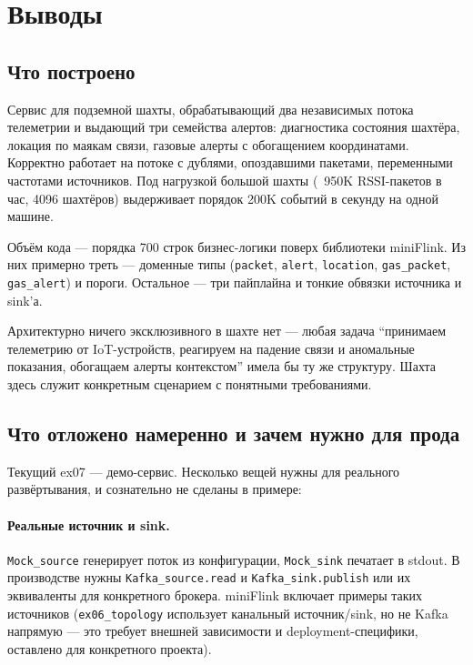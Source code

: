 
\section{Выводы}\label{sec:conclusions}

\subsection{Что построено}

Сервис для подземной шахты, обрабатывающий два независимых потока
телеметрии и выдающий три семейства алертов: диагностика состояния
шахтёра, локация по маякам связи, газовые алерты с обогащением
координатами. Корректно работает на потоке с дублями, опоздавшими
пакетами, переменными частотами источников. Под нагрузкой большой
шахты (~950K RSSI-пакетов в час, 4096 шахтёров) выдерживает порядок
200K событий в секунду на одной машине.

Объём кода --- порядка 700 строк бизнес-логики поверх библиотеки
miniFlink. Из них примерно треть --- доменные типы (\texttt{packet},
\texttt{alert}, \texttt{location}, \texttt{gas\_packet},
\texttt{gas\_alert}) и пороги. Остальное --- три пайплайна и
тонкие обвязки источника и sink'а.

Архитектурно ничего эксклюзивного в шахте нет --- любая задача
``принимаем телеметрию от IoT-устройств, реагируем на падение
связи и аномальные показания, обогащаем алерты контекстом'' имела
бы ту же структуру. Шахта здесь служит конкретным сценарием с
понятными требованиями.

\subsection{Что отложено намеренно и зачем нужно для прода}

Текущий ex07 --- демо-сервис. Несколько вещей нужны для реального
развёртывания, и сознательно не сделаны в примере:

\paragraph{Реальные источник и sink.} \texttt{Mock\_source}
генерирует поток из конфигурации, \texttt{Mock\_sink} печатает в
stdout. В производстве нужны \texttt{Kafka\_source.read} и
\texttt{Kafka\_sink.publish} или их эквиваленты для конкретного
брокера. miniFlink включает примеры таких источников
(\texttt{ex06\_topology} использует канальный источник/sink, но
не Kafka напрямую --- это требует внешней зависимости и
deployment-специфики, оставлено для конкретного проекта).

